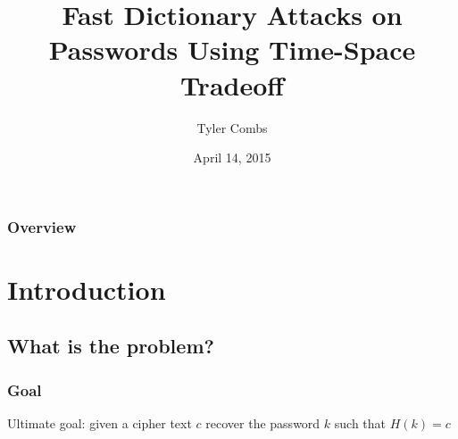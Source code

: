 \documentclass{beamer}
\title[Exit Exam]{Fast Dictionary Attacks on Passwords Using Time-Space Tradeoff} %
\author{Tyler Combs} %
\institute[OU] %
{
The University of Oklahoma \\ %
\medskip
\textit{tyler.combs@ou.edu} %
}
\date{April 14, 2015} %
\begin{document}
\begin{frame}
\titlepage %
\end{frame}

\begin{frame}
\frametitle{Overview} %
\tableofcontents %
\end{frame}


\section{Introduction} 
\subsection{What is the problem?}



\begin{frame}
\frametitle{Goal}
Ultimate goal: given a cipher text $c$ recover the password $k$ such that $H(k) = c$
\end{frame}
\end{document}
